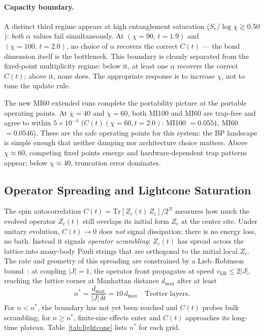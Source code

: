 \documentclass[11pt]{article}
\newcommand{\Ct}{C(t)}
\begin{document}
\paragraph{Capacity boundary.}
A distinct third regime appears at high entanglement saturation
($S_e/\log\chi \gtrsim 0.50$): \emph{both} $\alpha$ values fail simultaneously.
At $(\chi=90,\,t=1.9)$ and $(\chi=100,\,t=2.0)$, no choice of $\alpha$
recovers the correct $\Ct$ --- the bond dimension itself is the bottleneck.
This boundary is cleanly separated from the fixed-point multiplicity regime:
below it, at least one $\alpha$ recovers the correct $\Ct$; above it, none does.
The appropriate response is to increase $\chi$, not to tune the update rule.

The new MI60 extended runs complete the portability picture at the
portable operating points.
At $\chi=40$ and $\chi=60$, both MI100 and MI60 are trap-free and agree to
within $5\times10^{-4}$ ($\Ct(\chi=60, t=2.0)$: MI100 $= 0.0551$,
MI60 $= 0.0546$).
These are the safe operating points for this system: the BP landscape is
simple enough that neither damping nor architecture choice matters.
Above $\chi\approx 60$, competing fixed points emerge and hardware-dependent
trap patterns appear; below $\chi\approx 40$, truncation error dominates.

\subsection{Operator Spreading and Lightcone Saturation}
\label{sec:lightcone}

The spin autocorrelation $\Ct = \mathrm{Tr}[Z_c(t)\,Z_c]/2^N$ measures how
much the evolved operator $Z_c(t)$ still overlaps its initial form $Z_c$ at
the center site.
Under unitary evolution, $\Ct \to 0$ does \emph{not} signal dissipation:
there is no energy loss, no bath.
Instead it signals \emph{operator scrambling}: $Z_c(t)$ has spread across
the lattice into many-body Pauli strings that are orthogonal to the initial
local $Z_c$.
The rate and geometry of this spreading are constrained by a Lieb--Robinson
bound~\citep{liebrobinson}: at coupling $|J|=1$, the operator front
propagates at speed $v_{\mathrm{LR}} \leq 2|J|$, reaching the lattice corner
at Manhattan distance $d_{\mathrm{max}}$ after at least
\begin{equation}
  n^* = \frac{d_{\mathrm{max}}}{|J|\,\delta t} = 10\,d_{\mathrm{max}}
  \quad \text{Trotter layers.}
  \label{eq:nstar}
\end{equation}
For $n < n^*$, the boundary has not yet been reached and $\Ct$ probes
bulk scrambling; for $n \geq n^*$, finite-size effects enter and $\Ct$
approaches its long-time plateau.
Table~\ref{tab:lightcone} lists $n^*$ for each grid.
\end{document}
